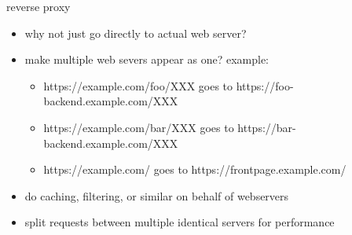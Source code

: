\begin{frame}{reverse proxy}
    \begin{itemize}
    \item why not just go directly to actual web server?
    \vspace{.5cm}
    \item make multiple web severs appear as one? example:
        \begin{itemize}
        \item https://example.com/foo/XXX goes to https://foo-backend.example.com/XXX
        \item https://example.com/bar/XXX goes to https://bar-backend.example.com/XXX
        \item https://example.com/ goes to https://frontpage.example.com/
        \end{itemize}
    \item do caching, filtering, or similar on behalf of webservers
    \item split requests between multiple identical servers for performance
    \end{itemize}
\end{frame}
